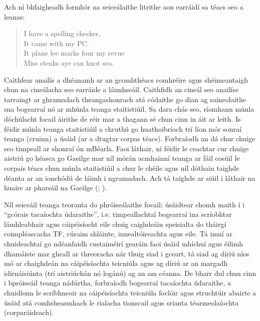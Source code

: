 \begin{multicols}{2}
Ach ní bhfaigheadh formhór na seiceálaithe litrithe aon earráidí sa téacs seo \cite{zar1} a leanas: 

\begin{quote}
  I have a spelling checker,\\
  It came with my PC.\\
  It plane lee marks four my revue\\
  Miss steaks aye can knot sea.
\end{quote}

Caithfear anailís a dhéanamh ar an gcomhthéacs comhréire agus shéimeantaigh chun na cineálacha seo earráide a láimhseáil. Caithfidh an cineál seo anailíse tarraingt ar ghramadach theangashonrach atá códaithe go dian ag saineolaithe sna bogearraí nó ar mhúnla teanga staitistiúil. Sa dara chás seo, ríomhann múnla dóchúlacht focail áirithe de réir mar a thagann sé chun cinn in áit ar leith. Is féidir múnla teanga staitistiúil a chruthú go huathoibríoch trí líon mór sonraí teanga (cruinn) a úsáid (ar a dtugtar corpas téacs). Forbraíodh an dá chur chuige seo timpeall ar shonraí ón mBéarla. Faoi láthair, ní féidir le ceachtar cur chuige aistriú go héasca go Gaeilge mar níl mórán acmhainní teanga ar fáil cosúil le corpais téacs chun múnla staitistiúil a chur le chéile agus níl dóthain taighde déanta ar an ionchódú de láimh i ngramadach. Ach tá taighde ar siúil i láthair na huaire ar pharsáil na Gaeilge (\cite{lynn2012}; \cite{elaine2010}).


Níl seiceáil teanga teoranta do phróiseálaithe focail; úsáidtear chomh maith í i ``gcórais tacaíochta údaraithe'', i.e. timpeallachtaí bogearraí ina scríobhtar lámhleabhair agus cáipéisíocht eile chuig caighdeáin speisialta do tháirgí coimpléascacha TF, cúraim shláinte, innealtóireachta agus eile. Tá imní ar chuideachtaí go ndéanfaidh custaiméirí gearáin faoi úsáid mhíchuí agus éilimh dhamáiste mar gheall ar threoracha nár thuig siad i gceart, tá siad ag díriú níos mó ar chaighdeán na cáipéisíochta teicniúla agus ag díriú ar an margadh idirnáisiúnta (trí aistriúchán nó logánú) ag an am céanna. De bharr dul chun cinn i bpróiseáil teanga nádúrtha, forbraíodh bogearraí tacaíochta údaraithe, a chuidíonn le scríbhneoir na cáipéisíochta teicniúla foclóir agus struchtúir abairte a úsáid atá comhsheasmhach le rialacha tionscail agus srianta téarmeolaíochta (corparáideach).


\end{multicols}
